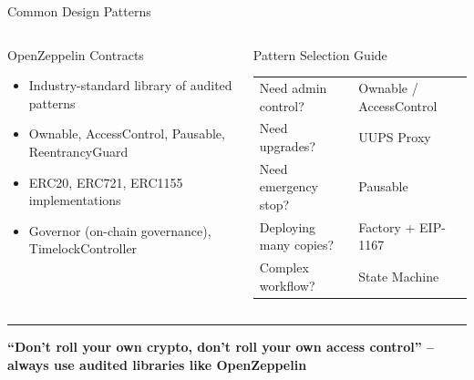 \documentclass[8pt,aspectratio=169]{beamer}
\newcommand{\bottomnote}[1]{\vfill\vspace{-2mm}\textcolor{mllavender2}{\rule{\textwidth}{0.4pt}}\vspace{1mm}\footnotesize\textbf{#1}}
\begin{document}
\begin{frame}{Common Design Patterns}
\begin{center}
\end{center}
\vspace{2mm}
\begin{columns}
\begin{block}{OpenZeppelin Contracts}
\begin{itemize}\small
  \item Industry-standard library of audited patterns
  \item Ownable, AccessControl, Pausable, ReentrancyGuard
  \item ERC20, ERC721, ERC1155 implementations
  \item Governor (on-chain governance), TimelockController
\end{itemize}
\end{block}
\begin{alertblock}{Pattern Selection Guide}
\small
\begin{tabular}{@{}ll@{}}
Need admin control? & Ownable / AccessControl \\
Need upgrades? & UUPS Proxy \\
Need emergency stop? & Pausable \\
Deploying many copies? & Factory + EIP-1167 \\
Complex workflow? & State Machine \\
\end{tabular}
\end{alertblock}
\end{columns}
\bottomnote{``Don't roll your own crypto, don't roll your own access control'' -- always use audited libraries like OpenZeppelin}
\end{frame}
\end{document}
